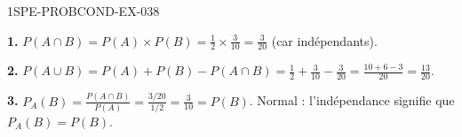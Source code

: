 \begin{corrige}{1SPE-PROBCOND-EX-038}

\textbf{1.} $P(A \cap B) = P(A) \times P(B) = \frac{1}{2} \times \frac{3}{10} = \frac{3}{20}$ (car indépendants).

\textbf{2.} $P(A \cup B) = P(A)+P(B)-P(A \cap B) = \frac{1}{2}+\frac{3}{10}-\frac{3}{20} = \frac{10+6-3}{20} = \frac{13}{20}$.

\textbf{3.} $P_A(B) = \frac{P(A \cap B)}{P(A)} = \frac{3/20}{1/2} = \frac{3}{10} = P(B)$. Normal : l'indépendance signifie que $P_A(B) = P(B)$.

\end{corrige}
